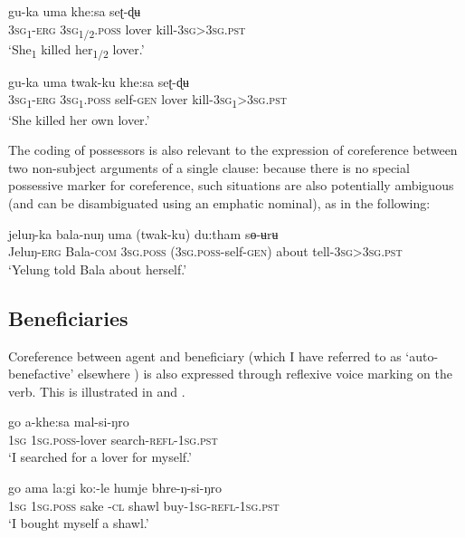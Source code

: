 \documentclass[output=paper]{langscibook}
\begin{document}
\ea%
    \label{ex:Lahaussois:33}
    \gll gu-ka uma khe:sa seʈ-ɖʉ\\
       3\textsc{sg}\textsc{\textsubscript{1}}\textsc{{}-erg} \textsc{3sg}\textsc{\textsubscript{1/2}}\textsc{.poss} lover   kill-\textsc{3sg>3sg.pst} \\
    \glt ‘She\textsubscript{1} killed her\textsubscript{1/2} lover.'
    \z



\ea%
    \label{ex:Lahaussois:34}
    \gll gu-ka uma twak-ku khe:sa seʈ-ɖʉ\\
        3\textsc{sg}\textsc{\textsubscript{1}}\textsc{{}-erg} 3\textsc{sg}\textsc{\textsubscript{1}}\textsc{.poss} self-\textsc{gen} lover kill-\textsc{3sg}\textsc{\textsubscript{1}}\textsc{>3sg.pst}\\
    \glt ‘She killed her own lover.'
    \z 

The coding of possessors is also relevant to the expression of coreference between two non-subject arguments of a single clause: because there is no special possessive marker for coreference, such situations are also potentially ambiguous (and can be disambiguated using an emphatic nominal), as in the following:

\ea%
    \label{ex:Lahaussois:35}
    \gll jeluŋ-ka bala-nuŋ uma (twak-ku) du:tham sɵ-ʉrʉ\\
        Jeluŋ-\textsc{erg} Bala-\textsc{com} \textsc{3sg.poss} \textsc{(3sg.poss}{}-self-\textsc{gen)} about tell-\textsc{3sg>3sg.pst}\\
    \glt ‘Yelung told Bala about herself.'
    \z


\subsection{Beneficiaries}
\label{sec:Lahaussois:5.2}

Coreference between agent and beneficiary (which I have referred to as ‘auto-benefactive' elsewhere \citealt{Lahaussois2016,JacquesEtAl2016}) is also expressed through reflexive voice marking on the verb.  This is illustrated in  and .  

\ea%
    \label{ex:Lahaussois:36}
    \gll go a-khe:sa mal-si-ŋro\\
        \textsc{1sg} \textsc{1sg.poss}{}-lover search-\textsc{refl-1sg.pst}\\
    \glt ‘I searched for a lover for myself.'
    \z


\ea%
    \label{ex:Lahaussois:37}
    \gll go ama la:gi ko:-le humje bhre-ŋ-si-ŋro\\
        \textsc{1sg} \textsc{1sg.poss} sake \textsc{-cl} shawl buy-\textsc{1sg-refl-1sg.pst}\\
    \glt ‘I bought myself a shawl.'
    \z
\end{document}
